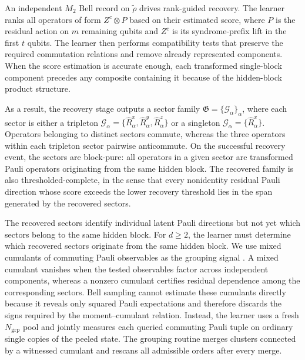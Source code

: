 \documentclass[
  aps,
  prx,
  reprint,
  superscriptaddress,
  amsmath,
  amssymb,
  nofootinbib,
  longbibliography
]{revtex4-2}
\begin{document}
An independent $M_2$ Bell record on $\widetilde\rho$ drives rank-guided
recovery.  The learner ranks all operators of form $Z^c\otimes P$ based on their estimated score, where
$P$ is the residual action on $m$ remaining qubits and $Z^c$ is its syndrome-prefix lift in the first $t$ qubits. 
The learner then performs compatibility tests that preserve the required commutation relations and remove already represented components.
When the score estimation is accurate enough,  each transformed single-block
component precedes any composite containing it because of the hidden-block product structure.

As a result, the recovery stage outputs a sector family
$\mathfrak G=\{\mathcal G_\alpha\}_\alpha$, where each sector is either a
tripleton
$\mathcal G_\alpha=\{\widehat R_\alpha^x,\widehat R_\alpha^y,
\widehat R_\alpha^z\}$ or a singleton
$\mathcal G_\alpha=\{\widehat R_\alpha^x\}$. Operators belonging to distinct
sectors commute, whereas the three operators within each tripleton sector
pairwise anticommute. On the successful recovery event, the sectors are
block-pure: all operators in a given sector are transformed Pauli operators
originating from the same hidden block. The recovered family is also
thresholded-complete, in the sense that every nonidentity residual Pauli
direction whose score exceeds the lower recovery threshold lies in the span
generated by the recovered sectors.


The recovered sectors identify individual latent Pauli directions but not yet which sectors belong to the same hidden block. 
For $d\ge2$, the learner must determine which recovered sectors originate
from the same hidden block. We use mixed cumulants of commuting Pauli
observables as the grouping signal
\cite{doubilet1972foundations,smith2020multivariateKstatistics}. A mixed
cumulant vanishes when the tested observables factor across independent
components, whereas a nonzero cumulant certifies residual dependence among
the corresponding sectors. Bell sampling cannot estimate these cumulants
directly because it reveals only squared Pauli expectations and therefore
discards the signs required by the moment--cumulant relation. Instead, the
learner uses a fresh $N_{\mathrm{grp}}$ pool and jointly measures each queried
commuting Pauli tuple on ordinary single copies of the peeled state. The
grouping routine merges clusters connected by a witnessed cumulant and
rescans all admissible orders after every merge.
\end{document}

